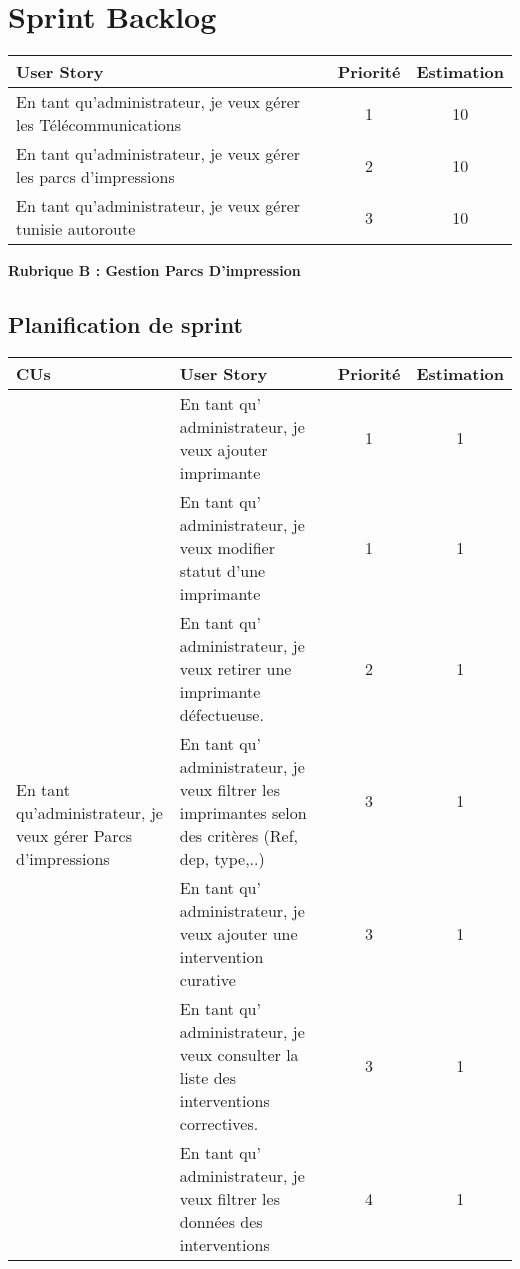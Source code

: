 \documentclass[a4paper,11pt]{report}
\begin{document}
\section{Sprint Backlog}

\begin{table}[h]
\centering
\begin{tabular}{|>{\raggedright\arraybackslash}p{7cm}|c|c|}
\hline
\textbf{User Story} & \textbf{Priorité} & \textbf{Estimation} \\
\hline
En tant qu’administrateur, je veux gérer les Télécommunications 
& 1 & 10 \\
\hline
En tant qu’administrateur, je veux gérer les parcs d’impressions 
& 2 & 10 \\
\hline
En tant qu’administrateur, je veux gérer tunisie autoroute 
& 3 & 10 \\
\hline
\end{tabular}
\end{table}
\newpage


\textbf{Rubrique B : Gestion  Parcs D'impression}
\subsection{Planification de sprint }

\begin{tabular}{|m{4cm}|m{5cm}|c|c|}
\hline
\textbf{	CUs} & \textbf{User Story} & \textbf{Priorité} & \textbf{Estimation} \\
\hline

\multirow{7}{4cm}{En tant qu’administrateur, je veux gérer Parcs d’impressions} 
& En tant qu' administrateur, je veux ajouter imprimante & 1 & 1 \\
\cline{2-4}
& En tant qu' administrateur, je veux modifier statut d’une imprimante & 1 & 1 \\
\cline{2-4}
& En tant qu' administrateur, je veux retirer une imprimante défectueuse. & 2 & 1 \\
\cline{2-4}
& En tant qu' administrateur, je veux filtrer les imprimantes selon des critères (Ref, dep, type,..) & 3 & 1 \\
\cline{2-4}
& En tant qu' administrateur, je veux ajouter une intervention curative & 3 & 1 \\
\cline{2-4}
& En tant qu' administrateur, je veux consulter la liste des interventions correctives. & 3 & 1 \\
\cline{2-4}
& En tant qu' administrateur, je veux filtrer les données des interventions & 4 & 1 \\
\hline
\end{tabular}
\end{document}

